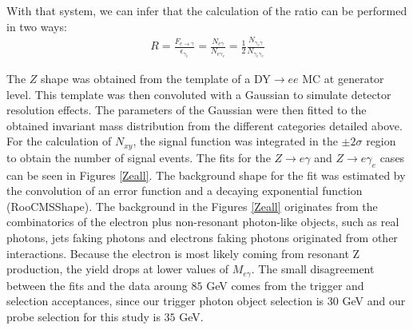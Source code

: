 With that system, we can infer that the calculation of the ratio can be performed in two ways:
\begin{eqnarray}
R  = \frac{F_{e\rightarrow \gamma}}{\epsilon_{\gamma_e}} = \frac{N_{e\gamma}}{N_{e\gamma_e}} = \frac{1}{2} \frac{N_{\gamma_e \gamma}}{N_{\gamma_e \gamma_e }}
\end{eqnarray}

The $Z$ shape was obtained from the template of a DY$\to ee$ MC at generator level. This template was then convoluted with a Gaussian to simulate detector resolution effects. The parameters of the Gaussian were then fitted to the obtained invariant mass distribution from the different categories detailed above. For the calculation of $N_{xy}$, the signal function was  integrated in the $\pm 2\sigma$ region to obtain the number of signal events. The fits for the $Z\rightarrow e \gamma$ and $Z \rightarrow e \gamma_e$ cases can be seen in Figures \ref{Zeall}.
The background shape for the fit was estimated by the convolution of an error function and a decaying exponential function (RooCMSShape). The background in the Figures \ref{Zeall} originates from the combinatorics of the electron plus non-resonant photon-like objects, such as real photons, jets faking photons and electrons faking photons originated from other interactions. Because the electron is most likely coming from  resonant Z production, the yield drops at lower values of $M_{e\gamma}$. The small disagreement between the fits and the data aroung $85$ GeV comes from the trigger and selection acceptances, since our trigger photon object selection is $30$ GeV and our probe selection \pt for this study is $35$ GeV. 


